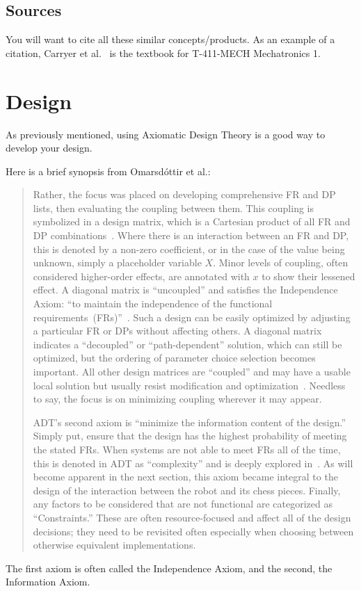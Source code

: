 \documentclass{svproc}
\begin{document}
\subsection{Sources}\label{sec:sources}
You will want to cite all these similar concepts/products.
As an example of a citation, Carryer et al.~\cite{carryer2011IntroMechatronics} is the textbook for T-411-MECH Mechatronics 1.


\section{Design}\label{sec:design}
As previously mentioned, using Axiomatic Design Theory is a good way to develop your design.

Here is a brief synopsis from Omarsdóttir et al.\cite{omarsdottir2016chessmate}:
\begin{quotation}
  Rather, the focus was placed on developing comprehensive FR and DP lists, then evaluating the coupling between them.
  This coupling is symbolized in a design matrix, which is a Cartesian product of all FR and DP combinations~\cite{cochran2016msdd,benevides2012aed}.
Where there is an interaction between an FR and DP, this is denoted by a non-zero coefficient, or in the case of the value being unknown, simply a placeholder variable $X$.
Minor levels of coupling, often considered higher-order effects, are annotated with $x$ to show their lessened effect.
A diagonal matrix is ``uncoupled'' and satisfies the Independence Axiom: ``to maintain the independence of the functional requirements~(FRs)''~\cite{suh2001axiomatic}.
Such a design can be easily optimized by adjusting a particular FR or DPs without affecting others.
A diagonal matrix indicates a ``decoupled'' or ``path-dependent'' solution, which can still be optimized, but the ordering of parameter choice selection becomes important.
All other design matrices are ``coupled'' and may have a usable local solution but usually resist modification and optimization~\cite{suh2001axiomatic}.
Needless to say, the focus is on minimizing coupling wherever it may appear.

ADT's second axiom is ``minimize the information content of the design.''
Simply put, ensure that the design has the highest probability of meeting the stated FRs.
When systems are not able to meet FRs all of the time, this is denoted in ADT as ``complexity'' and is deeply explored in~\cite{suh2005complexity}.
As will become apparent in the next section, this axiom became integral to the design of the interaction between the robot and its chess pieces.
Finally, any factors to be considered that are not functional are categorized as ``Constraints.''
These are often resource-focused and affect all of the design decisions; they need to be revisited often especially when choosing between otherwise equivalent implementations.
\end{quotation}
The first axiom is often called the Independence Axiom, and the second, the Information Axiom.
\end{document}
